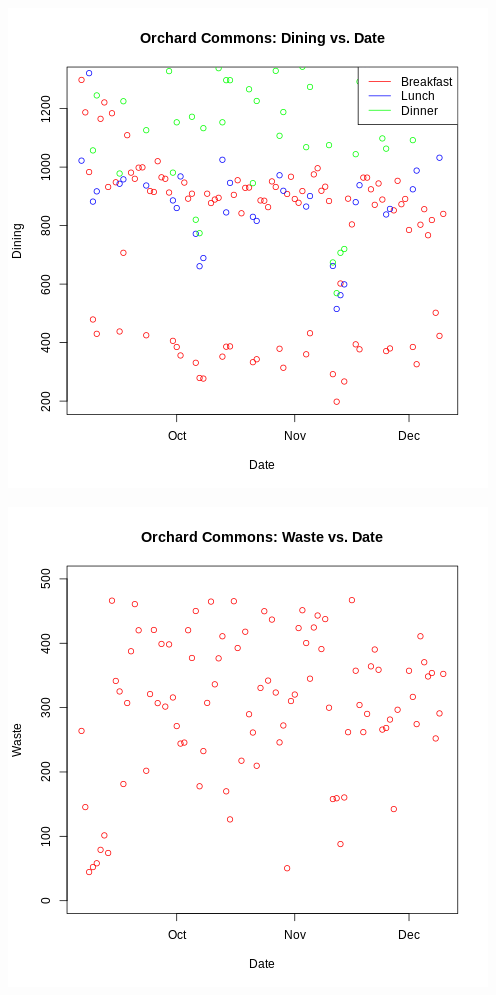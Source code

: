 \begin{center}
    \includegraphics[scale = 0.575]{graph_table/OC_dining.png}
\end{center}

\begin{center}
    \includegraphics[scale = 0.575]{graph_table/OC_waste.png}
\end{center}

